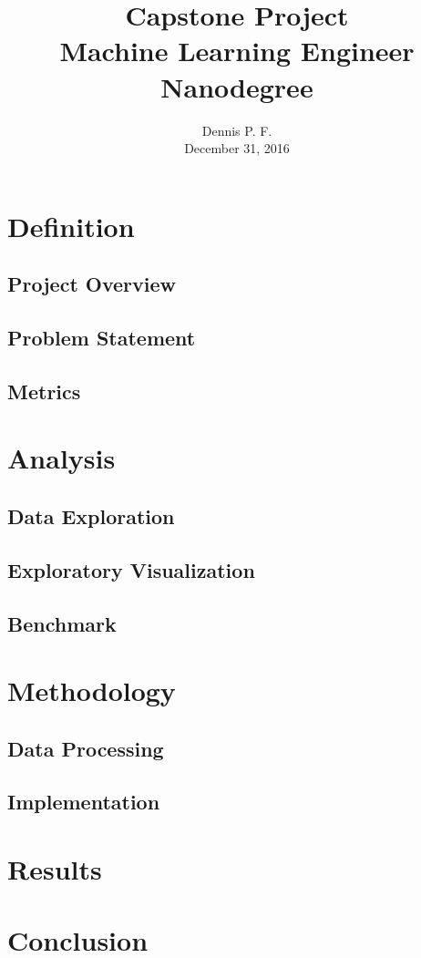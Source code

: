 \documentclass{svproc}
\begin{document}
\mainmatter
\title{Capstone Project \\ {\large Machine Learning Engineer Nanodegree}}
\author{{\large Dennis P. F.} \\ {\small December 31, 2016}}
\institute{}
\maketitle

\section{Definition}
\subsection*{Project Overview}
\subsection*{Problem Statement}
\subsection*{Metrics}
\section{Analysis}
\subsection*{Data Exploration}
\subsection*{Exploratory Visualization}
\subsection*{Benchmark}
\section{Methodology}
\subsection*{Data Processing}
\subsection*{Implementation}
\section{Results}
\section{Conclusion}
\begin{thebibliography}{}

\end{thebibliography}
\end{document}
